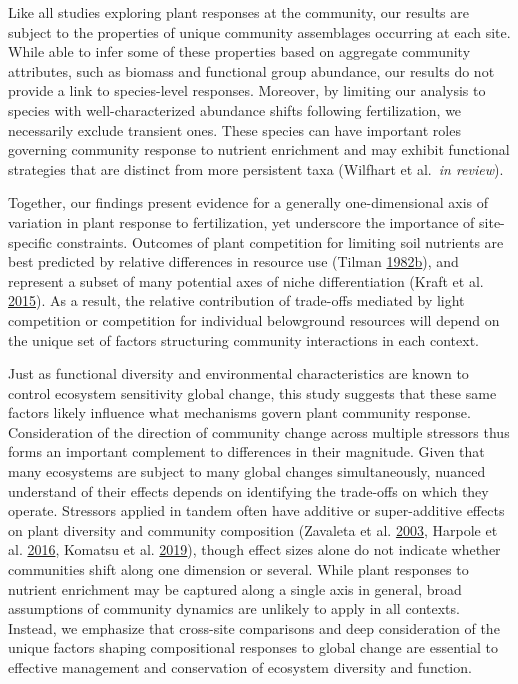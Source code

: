 \documentclass[twoside,12pt,final]{ucthesis-CA2012}
\begin{document}
\begin{ucmainmatter}
Like all studies exploring plant responses at the community, our results are subject to the properties of unique community assemblages occurring at each site. While able to infer some of these properties based on aggregate community attributes, such as biomass and functional group abundance, our results do not provide a link to species-level responses. Moreover, by limiting our analysis to species with well-characterized abundance shifts following fertilization, we necessarily exclude transient ones. These species can have important roles governing community response to nutrient enrichment and may exhibit functional strategies that are distinct from more persistent taxa (Wilfhart et al.~\emph{in review}).

Together, our findings present evidence for a generally one-dimensional axis of variation in plant response to fertilization, yet underscore the importance of site-specific constraints. Outcomes of plant competition for limiting soil nutrients are best predicted by relative differences in resource use (Tilman \protect\hyperlink{ref-Tilman1982}{1982}\protect\hyperlink{ref-Tilman1982}{b}), and represent a subset of many potential axes of niche differentiation (Kraft et al. \protect\hyperlink{ref-Kraft2015}{2015}). As a result, the relative contribution of trade-offs mediated by light competition or competition for individual belowground resources will depend on the unique set of factors structuring community interactions in each context.

Just as functional diversity and environmental characteristics are known to control ecosystem sensitivity global change, this study suggests that these same factors likely influence what mechanisms govern plant community response. Consideration of the direction of community change across multiple stressors thus forms an important complement to differences in their magnitude. Given that many ecosystems are subject to many global changes simultaneously, nuanced understand of their effects depends on identifying the trade-offs on which they operate. Stressors applied in tandem often have additive or super-additive effects on plant diversity and community composition (Zavaleta et al. \protect\hyperlink{ref-Zavaleta2003}{2003}, Harpole et al. \protect\hyperlink{ref-Harpole2016}{2016}, Komatsu et al. \protect\hyperlink{ref-Komatsu2019}{2019}), though effect sizes alone do not indicate whether communities shift along one dimension or several. While plant responses to nutrient enrichment may be captured along a single axis in general, broad assumptions of community dynamics are unlikely to apply in all contexts. Instead, we emphasize that cross-site comparisons and deep consideration of the unique factors shaping compositional responses to global change are essential to effective management and conservation of ecosystem diversity and function.


\end{ucmainmatter}
\end{document}
